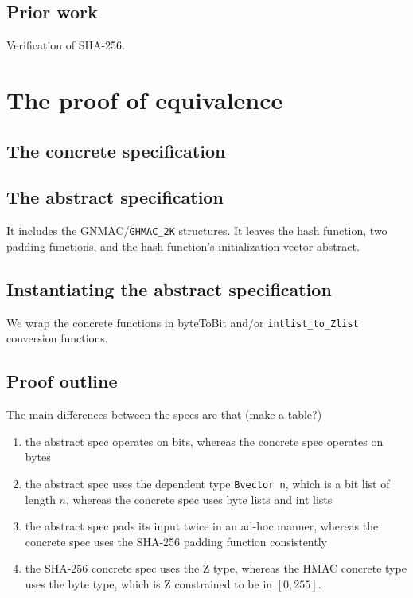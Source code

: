\documentclass[twocolumn,showpacs,%
  nofootinbib,aps,superscriptaddress,%
  eqsecnum,prd,notitlepage,showkeys,10pt]{revtex4-1}
\begin{document}
\subsection{Prior work}

Verification of SHA-256.

\section{The proof of equivalence}

\subsection{The concrete specification}

\subsection{The abstract specification}

It includes the GNMAC/\verb|GHMAC_2K| structures. It leaves the hash function, two padding functions, and the hash function's initialization vector abstract.

\subsection{Instantiating the abstract specification}

We wrap the concrete functions in byteToBit and/or \verb|intlist_to_Zlist| conversion functions. 

\subsection{Proof outline}

The main differences between the specs are that (make a table?)
\begin{enumerate} 
\item the abstract spec operates on bits, whereas the concrete spec operates on bytes
\item the abstract spec uses the dependent type \verb|Bvector n|, which is a bit list of length $n$, whereas the concrete spec uses byte lists and int lists
\item the abstract spec pads its input twice in an ad-hoc manner, whereas the concrete spec uses the SHA-256 padding function consistently
\item the SHA-256 concrete spec uses the Z type, whereas the HMAC concrete type uses the byte type, which is Z constrained to be in $[0, 255]$.
\end{enumerate}
\end{document}
